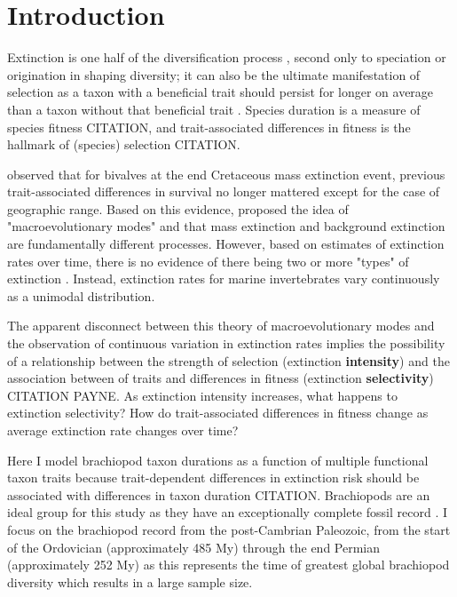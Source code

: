 \documentclass{article}
\begin{document}
\section{Introduction}

Extinction is one half of the diversification process \citep{Raup1994,Stanley1979,Stanley1975}, second only to speciation or origination in shaping diversity; it can also be the ultimate manifestation of selection as a taxon with a beneficial trait should persist for longer on average than a taxon without that beneficial trait \citep{Rabosky2010b,Jablonski2008a,Raup1994,Stanley1975}. Species duration is a measure of species fitness CITATION, and trait-associated differences in fitness is the hallmark of (species) selection CITATION.

\citet{Jablonski1986} observed that for bivalves at the end Cretaceous mass extinction event, previous trait-associated differences in survival no longer mattered except for the case of geographic range. Based on this evidence, \citet{Jablonski1986} proposed the idea of "macroevolutionary modes" and that mass extinction and background extinction are fundamentally different processes. However, based on estimates of extinction rates over time, there is no evidence of there being two or more "types" of extinction \citep{Wang2003}. Instead, extinction rates for marine invertebrates vary continuously as a unimodal distribution.

The apparent disconnect between this theory of macroevolutionary modes and the observation of continuous variation in extinction rates implies the possibility of a relationship between the strength of selection (extinction \textbf{intensity}) and the association between of traits and differences in fitness (extinction \textbf{selectivity}) CITATION PAYNE. As extinction intensity increases, what happens to extinction selectivity? How do trait-associated differences in fitness change as average extinction rate changes over time?

Here I model brachiopod taxon durations as a function of multiple functional taxon traits because trait-dependent differences in extinction risk should be associated with differences in taxon duration CITATION. Brachiopods are an ideal group for this study as they have an exceptionally complete fossil record \citep{Foote1996e,Foote2000a}. I focus on the brachiopod record from the post-Cambrian Paleozoic, from the start of the Ordovician (approximately 485 My) through the end Permian (approximately 252 My) as this represents the time of greatest global brachiopod diversity \citep{Alroy2010} which results in a large sample size.
\end{document}
